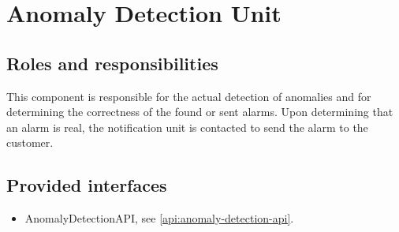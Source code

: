 \section{Anomaly Detection Unit}
\label{element:anomaly-detection-unit}

\subsection{Roles and responsibilities}

\npar This component is responsible for the actual detection of anomalies and
for determining the correctness of the found or sent alarms. Upon determining
that an alarm is real, the notification unit is contacted to send the alarm to
the customer.

\subsection{Provided interfaces}

\begin{itemize}
  \item AnomalyDetectionAPI, see \ref{api:anomaly-detection-api}.
\end{itemize}



